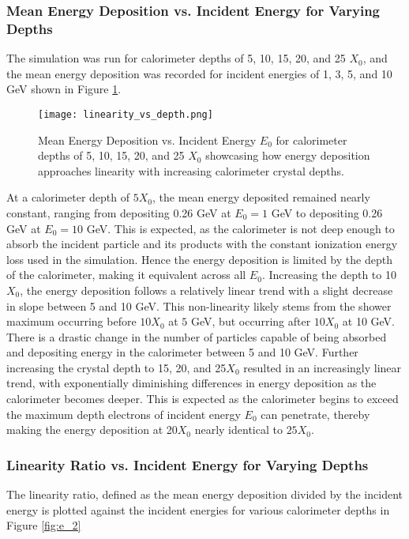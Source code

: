 \documentclass[twocolumn]{aastex631}
\begin{document}
\subsubsection{Mean Energy Deposition vs. Incident Energy for Varying Depths} 

The simulation was run for calorimeter depths of 5, 10, 15, 20, and 25 $X_0$,
and the mean energy deposition was recorded for incident energies of 1, 3, 5,
and 10 GeV shown in Figure \ref{fig:e_1}. 
 
\begin{figure}[htp]
  \centering
    \texttt{[image: linearity\_vs\_depth.png]}
    \caption{Mean Energy Deposition vs. Incident Energy $E_0$ for calorimeter
        depths of 5, 10, 15, 20, and 25 $X_0$ showcasing how energy deposition
    approaches linearity with increasing calorimeter crystal depths.}
    \label{fig:e_1}
\end{figure}


At a calorimeter depth of $5X_0$, the mean energy deposited remained nearly constant,
ranging from depositing 0.26 GeV at $E_0 = 1$ GeV to depositing 0.26 GeV at $E_0
= 10$ GeV. This is expected, as the calorimeter is not deep enough to absorb
the incident particle and its products with the constant ionization energy loss
used in the simulation. Hence the energy deposition is limited by the depth of
the calorimeter, making it equivalent across all $E_0$. Increasing the depth to
10$X_0$, the energy deposition follows a relatively linear trend with a slight
decrease in slope between 5 and 10 GeV. This non-linearity likely
stems from the shower maximum occurring before $10X_0$ at $5$ GeV, but occurring
after  $10X_0$ at 10 GeV. There is a drastic change in the number of particles
capable of being absorbed and depositing energy in the calorimeter between 5 and
10 GeV. Further increasing the crystal depth to 15, 20, and 25$X_0$ resulted in an
increasingly linear trend, with exponentially diminishing differences in energy deposition as
the calorimeter becomes deeper. This is expected as the calorimeter begins to
exceed the maximum depth electrons of incident energy $E_0$ can penetrate, thereby
making the energy deposition at 20$X_0$ nearly identical to $25X_0$.

\subsubsection{Linearity Ratio vs. Incident Energy for Varying Depths} 

The linearity ratio, defined as the mean energy deposition divided by the
incident energy is plotted against the incident energies for various calorimeter
depths in Figure \ref{fig:e_2} 
\end{document}
